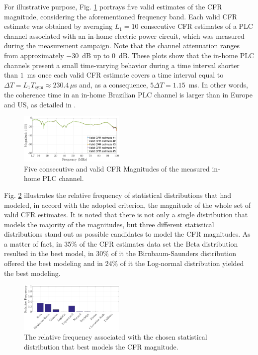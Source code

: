 \documentclass[journal]{IEEEtran}
\begin{document}
For illustrative purpose, Fig. \ref{respfreq} portrays five valid estimates of the \ac{CFR} magnitude, considering the aforementioned frequency band. Each valid \ac{CFR} estimate was obtained by averaging  $L_1 = 10$ consecutive \ac{CFR} estimates of a \ac{PLC} channel associated with an in-home electric power circuit, which was measured during the measurement campaign. Note that the channel attenuation ranges from approximately $-30$~dB up to $0$~dB. These plots show that the in-home \ac{PLC} channels present a small time-varying behavior during a time interval shorter than $1$~ms once each valid \ac{CFR} estimate covers a time interval equal to $\Delta T = L_1 T_{\textrm{sym}} \approx 230.4\,\mu$s and, as a consequence, $5\Delta T = 1.15$~ms. In other words, the coherence time in an in-home Brazilian PLC channel is larger than in Europe and US, as detailed in \cite{Thiago:Characterization}.

\begin{figure}[h]
	\centering
	\includegraphics[width=0.45\textwidth]{images/respfreq_1.7.eps}
	\caption{Five consecutive and valid \ac{CFR} Magnitudes of the measured in-home \ac{PLC} channel.}
	\label{respfreq}
\end{figure}

Fig. \ref{MAG_percent} illustrates the relative frequency of statistical distributions that had modeled, in accord with the adopted criterion, the magnitude of the whole set of valid \ac{CFR} estimates. It is noted that there is not only a single distribution that models the majority of the magnitudes, but three different statistical distributions stand out as possible candidates to model the \ac{CFR} magnitudes. As a matter of fact, in 35\% of the \ac{CFR} estimates data set the Beta distribution resulted in the best model, in 30\% of it  the Birnbaum-Saunders distribution offered the best modeling and in 24\% of it the Log-normal distribution yielded the best modeling. 

\begin{figure}[h!]
	\centering
	\includegraphics[width=0.45\textwidth]{images/Mag_percent.eps}
	\caption{The relative frequency associated with the chosen statistical distribution that best models the \ac{CFR} magnitude.}
	\label{MAG_percent}
\end{figure}
\end{document}
